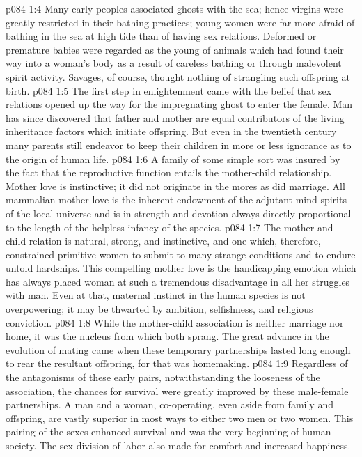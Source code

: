 \vs p084 1:4 Many early peoples associated ghosts with the sea; hence virgins were greatly restricted in their bathing practices; young women were far more afraid of bathing in the sea at high tide than of having sex relations. Deformed or premature babies were regarded as the young of animals which had found their way into a woman’s body as a result of careless bathing or through malevolent spirit activity. Savages, of course, thought nothing of strangling such offspring at birth.
\vs p084 1:5 The first step in enlightenment came with the belief that sex relations opened up the way for the impregnating ghost to enter the female. Man has since discovered that father and mother are equal contributors of the living inheritance factors which initiate offspring. But even in the twentieth century many parents still endeavor to keep their children in more or less ignorance as to the origin of human life.
\pc \vs p084 1:6 A family of some simple sort was insured by the fact that the reproductive function entails the mother\hyp{}child relationship. Mother love is instinctive; it did not originate in the mores as did marriage. All mammalian mother love is the inherent endowment of the adjutant mind\hyp{}spirits of the local universe and is in strength and devotion always directly proportional to the length of the helpless infancy of the species.
\vs p084 1:7 The mother and child relation is natural, strong, and instinctive, and one which, therefore, constrained primitive women to submit to many strange conditions and to endure untold hardships. This compelling mother love is the handicapping emotion which has always placed woman at such a tremendous disadvantage in all her struggles with man. Even at that, maternal instinct in the human species is not overpowering; it may be thwarted by ambition, selfishness, and religious conviction.
\vs p084 1:8 While the mother\hyp{}child association is neither marriage nor home, it was the nucleus from which both sprang. The great advance in the evolution of mating came when these temporary partnerships lasted long enough to rear the resultant offspring, for that was homemaking.
\vs p084 1:9 Regardless of the antagonisms of these early pairs, notwithstanding the looseness of the association, the chances for survival were greatly improved by these male\hyp{}female partnerships. A man and a woman, co\hyp{}operating, even aside from family and offspring, are vastly superior in most ways to either two men or two women. This pairing of the sexes enhanced survival and was the very beginning of human society. The sex division of labor also made for comfort and increased happiness.\plusone
